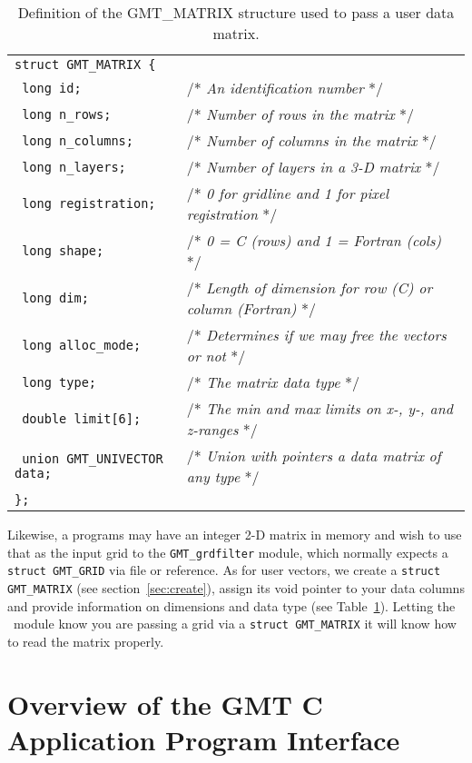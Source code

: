 \documentclass{report}
\begin{document}
\begin{table}[h]
\small
\centering
\begin{tabular}{ll} \hline
\multicolumn{2}{l}{\texttt{struct GMT\_MATRIX \{}} \\ 
\texttt{	long id;}		&       /* \emph{An identification number} */ \\
\texttt{	long n\_rows;}		&       /* \emph{Number of rows in the matrix} */ \\
\texttt{	long n\_columns;}	&       /* \emph{Number of columns in the matrix}  */\\
\texttt{	long n\_layers;}	&       /* \emph{Number of layers in a 3-D matrix}  */\\
\texttt{	long registration;}	&       /* \emph{0 for gridline and 1 for pixel registration}  */\\
\texttt{	long shape;}		&       /* \emph{0 = C (rows) and 1 = Fortran (cols)}  */\\
\texttt{	long dim;}		&       /* \emph{Length of dimension for row (C) or column (Fortran)}  */\\
\texttt{	long alloc\_mode;}	&       /* \emph{Determines if we may free the vectors or not}  */\\
\texttt{	long type;}		&       /* \emph{The matrix data type}  */\\
\texttt{	double limit[6];}	&       /* \emph{The min and max limits on x-, y-, and z-ranges}  */\\
\texttt{	union GMT\_UNIVECTOR data;}	&       /* \emph{Union with pointers a data matrix of any type}  */\\
\texttt{\};}	&        \\  \hline
\end{tabular}
\caption{Definition of the GMT\_MATRIX structure used to pass a user data matrix.}
\label{tbl:matrix}
\end{table}
\noindent
Likewise, a programs may have an integer 2-D matrix in memory 
and wish to use that as the input grid to the \texttt{GMT\_grdfilter} module, which normally
expects a \texttt{struct GMT\_GRID} via file or reference.  As for user vectors, we create a
\texttt{struct GMT\_MATRIX} (see section~\ref{sec:create}), assign its void pointer to your data
columns and provide information on dimensions and data type (see Table~\ref{tbl:matrix}).
Letting the \GMT\ module know you are passing a grid via a
\texttt{struct GMT\_MATRIX} it will know how to read the matrix properly.

\chapter{Overview of the GMT C Application Program Interface}
\end{document}
